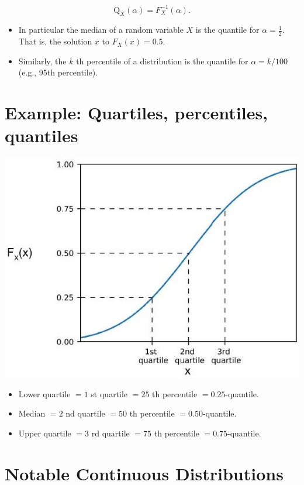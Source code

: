 \documentclass[10pt]{article}
\begin{document}
$$
\mathrm{Q}_{X}(\alpha)=F_{X}^{-1}(\alpha) .
$$

\begin{itemize}
  \item In particular the median of a random variable $X$ is the quantile for $\alpha=\frac{1}{2}$. That is, the solution $x$ to $F_{X}(x)=0.5$.
  \item Similarly, the $k$ th percentile of a distribution is the quantile for $\alpha=k / 100$ (e.g., 95th percentile).
\end{itemize}

\section*{Example: Quartiles, percentiles, quantiles}
\begin{center}
\includegraphics[max width=\textwidth]{2025_05_11_1201cfe24e14b364b4ecg-16}
\end{center}

\begin{itemize}
  \item Lower quartile $=1$ st quartile $=25$ th percentile $=0.25$-quantile.
  \item Median $=2$ nd quartile $=50$ th percentile $=0.50$-quantile.
  \item Upper quartile $=3$ rd quartile $=75$ th percentile $=0.75$-quantile.
\end{itemize}

\section*{Notable Continuous Distributions}
\end{document}

